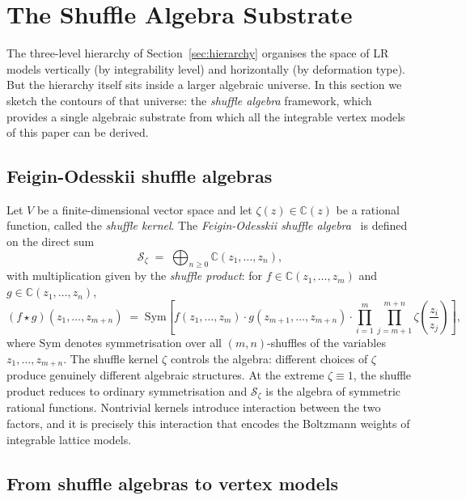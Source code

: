 
\section{The Shuffle Algebra Substrate}
\label{sec:shuffle}

The three-level hierarchy of Section~\ref{sec:hierarchy} organises the
space of LR models vertically (by integrability level) and
horizontally (by deformation type).  But the hierarchy itself sits
inside a larger algebraic universe.  In this section we sketch the
contours of that universe: the \emph{shuffle algebra} framework, which
provides a single algebraic substrate from which all the integrable
vertex models of this paper can be derived.

\subsection{Feigin-Odesskii shuffle algebras}
\label{sec:shuffle-def}

Let $V$ be a finite-dimensional vector space and let
$\zeta(z) \in \mathbb{C}(z)$ be a rational function, called the
\emph{shuffle kernel}.  The \emph{Feigin-Odesskii shuffle
algebra}~\cite{feigin-odesskii} is defined on the direct sum
\[
  \mathcal{S}_\zeta \;=\; \bigoplus_{n \geq 0} \mathbb{C}(z_1, \ldots, z_n),
\]
with multiplication given by the \emph{shuffle product}: for
$f \in \mathbb{C}(z_1, \ldots, z_m)$ and
$g \in \mathbb{C}(z_1, \ldots, z_n)$,
\begin{equation}\label{eq:shuffle-product}
  (f \star g)(z_1, \ldots, z_{m+n})
  \;=\;
  \mathrm{Sym}\!\left[
    f(z_1, \ldots, z_m) \cdot g(z_{m+1}, \ldots, z_{m+n})
    \cdot \prod_{i=1}^{m} \prod_{j=m+1}^{m+n}
    \zeta\!\left(\frac{z_i}{z_j}\right)
  \right],
\end{equation}
where $\mathrm{Sym}$ denotes symmetrisation over all
$(m,n)$-shuffles of the variables $z_1, \ldots, z_{m+n}$.  The
shuffle kernel $\zeta$ controls the algebra: different choices of
$\zeta$ produce genuinely different algebraic structures.  At the
extreme $\zeta \equiv 1$, the shuffle product reduces to ordinary
symmetrisation and $\mathcal{S}_\zeta$ is the algebra of symmetric
rational functions.  Nontrivial kernels introduce interaction between
the two factors, and it is precisely this interaction that encodes the
Boltzmann weights of integrable lattice models.

\subsection{From shuffle algebras to vertex models}

